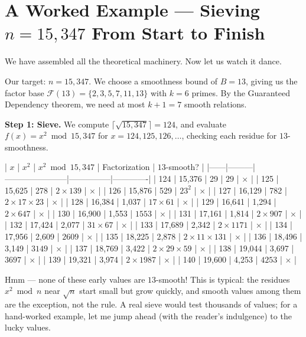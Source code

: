 \documentclass[11pt,twoside,openright]{book}
\theoremstyle{definition}
\theoremstyle{remark}
\begin{document}
\section{A Worked Example --- Sieving $n = 15{,}347$ From Start to Finish}

We have assembled all the theoretical machinery. Now let us watch it dance.

Our target: $n = 15{,}347$. We choose a smoothness bound of $B = 13$, giving us the factor base $\mathcal{F}(13) = \{2, 3, 5, 7, 11, 13\}$ with $k = 6$ primes. By the Guaranteed Dependency theorem, we need at most $k + 1 = 7$ smooth relations.

\textbf{Step 1: Sieve.} We compute $\lceil \sqrt{15{,}347} \rceil = 124$, and evaluate $f(x) = x^2 \bmod 15{,}347$ for $x = 124, 125, 126, \ldots$, checking each residue for $13$-smoothness.

| $x$  | $x^2$   | $x^2 \bmod 15{,}347$ | Factorization | $13$-smooth? |
|------|---------|-----------------------|---------------|-------------|
| 124  | 15,376  | 29                    | $29$          | $\times$           |
| 125  | 15,625  | 278                   | $2 \times 139$ | $\times$          |
| 126  | 15,876  | 529                   | $23^2$        | $\times$           |
| 127  | 16,129  | 782                   | $2 \times 17 \times 23$ | $\times$  |
| 128  | 16,384  | 1,037                 | $17 \times 61$ | $\times$          |
| 129  | 16,641  | 1,294                 | $2 \times 647$ | $\times$          |
| 130  | 16,900  | 1,553                 | $1553$        | $\times$           |
| 131  | 17,161  | 1,814                 | $2 \times 907$ | $\times$          |
| 132  | 17,424  | 2,077                 | $31 \times 67$ | $\times$          |
| 133  | 17,689  | 2,342                 | $2 \times 1171$ | $\times$         |
| 134  | 17,956  | 2,609                 | $2609$        | $\times$           |
| 135  | 18,225  | 2,878                 | $2 \times 11 \times 131$ | $\times$ |
| 136  | 18,496  | 3,149                 | $3149$        | $\times$           |
| 137  | 18,769  | 3,422                 | $2 \times 29 \times 59$ | $\times$  |
| 138  | 19,044  | 3,697                 | $3697$        | $\times$           |
| 139  | 19,321  | 3,974                 | $2 \times 1987$ | $\times$         |
| 140  | 19,600  | 4,253                 | $4253$        | $\times$           |

Hmm --- none of these early values are $13$-smooth! This is typical: the residues $x^2 \bmod n$ near $\sqrt{n}$ start small but grow quickly, and smooth values among them are the exception, not the rule. A real sieve would test thousands of values; for a hand-worked example, let me jump ahead (with the reader's indulgence) to the lucky values.
\end{document}
